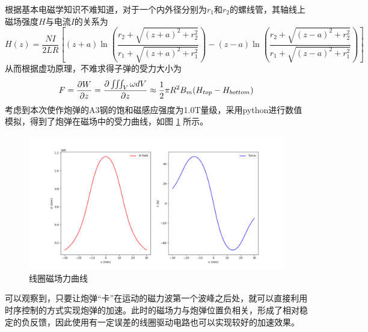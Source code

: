 \documentclass{article}
\begin{document}
根据基本电磁学知识不难知道，对于一个内外径分别为$r_1$和$r_2$的螺线管，其轴线上磁场强度$H$与电流$I$的关系为
\begin{equation}
    H(z)=\frac{NI}{2LR}\left[ (z+a)\ln \left(\frac{r_2+\sqrt{(z+a)^2+r_2^2}}{r_1+\sqrt{(z+a)^2+r_1^2}}\right)-(z-a)\ln \left(\frac{r_2+\sqrt{(z-a)^2+r_2^2}}{r_1+\sqrt{(z-a)^2+r_1^2}}\right)\right]
\end{equation}
从而根据虚功原理，不难求得子弹的受力大小为
\begin{equation}
    F=\frac{\partial W}{\partial z}=\frac{\partial\iiint_V\omega dV}{\partial z}\\
    \approx\frac{1}{2}\pi R^2B_m(H_{top}-H_{bottom})
\end{equation}
考虑到本次使作炮弹的A3钢的饱和磁感应强度为1.0T量级，采用python进行数值模拟，得到了炮弹在磁场中的受力曲线，如图 \ref{coil} 所示。

\begin{figure}
    \centering
    \includegraphics[width=.9\linewidth]{imgs/coid.png}
    \caption{线圈磁场力曲线}
    \label{coil}
\end{figure}
可以观察到，只要让炮弹“卡”在运动的磁力波第一个波峰之后处，就可以直接利用时序控制的方式实现炮弹的加速。此时的磁场力与炮弹位置负相关，形成了相对稳定的负反馈，因此使用有一定误差的线圈驱动电路也可以实现较好的加速效果。
\end{document}

